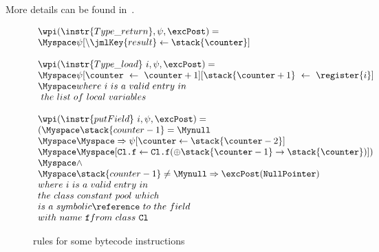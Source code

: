  More details can be found in~\cite{WPBC}.
\begin{figure}[ht]

$$
\begin{array}{l}
\wpi(\instr{Type\_return} , \psi, \excPost) =  \\
 \Myspace \psi[\backslash \jmlKey{result} \leftarrow \stack{\counter}] \\
\\
\wpi(\instr{Type\_load} \ i, \psi, \excPost) =  \\
\Myspace \psi[\counter \ \leftarrow \ \counter+1] [\stack{\counter+1} \ \leftarrow \ \register{i}] \\
 \Myspace where \ i \  is \ a \ valid \ entry \ in \\
 \ the \ list \  of \  local \ variables   \\
\\ 
\wpi(\instr{putField} \ i, \psi, \excPost) = \\
   ( \Myspace \stack{counter -1} = \Mynull \\
   \Myspace  \Myspace \Rightarrow \psi[\counter \leftarrow \stack{\counter -2} ] \\
   \Myspace  \Myspace [\texttt{Cl.f} \leftarrow \texttt{Cl.f}(\oplus \stack{\counter - 1} \rightarrow \stack{\counter}) ] )\\
   \Myspace  \wedge  \\
   \Myspace  \stack{counter-1} \not= \Mynull \Rightarrow \excPost(\tt{NullPointer}) \\
 where \ i \  is \ a \ valid \ entry \ in \\
  the \ class \ constant \  pool \ which   \\
 is  \ a \  symbolic \reference \ to \ the \  field  \\
 with \ name \  \texttt{f} from \  class \  \texttt{Cl}
 
 \end{array} $$



\caption{rules for some bytecode instructions}
\label{instrWP}
\end{figure}

